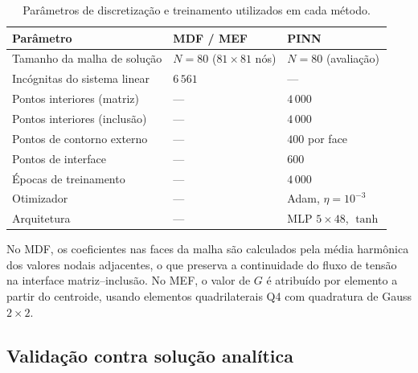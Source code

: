 \documentclass[brazil]{TCAM} %
\begin{document}
\begin{table}[h]
\centering
\caption{Parâmetros de discretização e treinamento utilizados em cada método.}
\label{tab:params}
\begin{tabular}{lll}
\hline
\textbf{Parâmetro} & \textbf{MDF / MEF} & \textbf{PINN} \\
\hline
Tamanho da malha de solução    & $N = 80$ ($81{\times}81$ nós) & $N = 80$ (avaliação) \\
Incógnitas do sistema linear   & $6\,561$                      & ---                  \\
Pontos interiores (matriz)     & ---                           & $4\,000$             \\
Pontos interiores (inclusão)   & ---                           & $4\,000$             \\
Pontos de contorno externo     & ---                           & $400$ por face       \\
Pontos de interface            & ---                           & $600$                \\
Épocas de treinamento          & ---                           & $4\,000$             \\
Otimizador                     & ---                           & Adam, $\eta=10^{-3}$ \\
Arquitetura                    & ---                           & MLP $5{\times}48$, $\tanh$ \\
\hline
\end{tabular}
\end{table}

No MDF, os coeficientes nas faces da malha são calculados pela média harmônica dos
valores nodais adjacentes, o que preserva a continuidade do fluxo de tensão na
interface matriz--inclusão. No MEF, o valor de $G$ é atribuído por elemento a partir
do centroide, usando elementos quadrilaterais Q4 com quadratura de Gauss $2{\times}2$.

\subsection{Validação contra solução analítica}
\label{sec:validacao}
\end{document}
